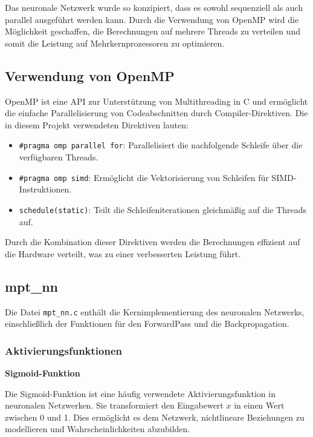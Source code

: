 \documentclass[a4paper, 12pt]{article}
\begin{document}
Das neuronale Netzwerk wurde so konzipiert, dass es sowohl sequenziell als auch parallel ausgeführt werden kann. Durch die Verwendung 
von OpenMP wird die Möglichkeit geschaffen, die Berechnungen auf mehrere Threads zu verteilen und somit die 
Leistung auf Mehrkernprozessoren zu optimieren.

\subsection{Verwendung von OpenMP}

OpenMP ist eine API zur Unterstützung von Multithreading in C und ermöglicht die einfache Parallelisierung von 
Codeabschnitten durch Compiler-Direktiven. Die in diesem Projekt verwendeten Direktiven lauten:

\begin{itemize}
    \item \texttt{\#pragma omp parallel for}: Parallelisiert die nachfolgende Schleife über die verfügbaren Threads.
    \item \texttt{\#pragma omp simd}: Ermöglicht die Vektorisierung von Schleifen für SIMD-Instruktionen.
    \item \texttt{schedule(static)}: Teilt die Schleifeniterationen gleichmäßig auf die Threads auf.
\end{itemize}

Durch die Kombination dieser Direktiven werden die Berechnungen effizient auf die Hardware verteilt, was zu einer verbesserten Leistung führt.

\subsection{mpt\_nn}
\label{subsec:mpt_nn}

Die Datei \texttt{mpt\_nn.c} enthält die Kernimplementierung des neuronalen Netzwerks, einschließlich der Funktionen für den ForwardPass und die Backpropagation.

\subsubsection{Aktivierungsfunktionen}

\textbf{Sigmoid-Funktion}

Die Sigmoid-Funktion ist eine häufig verwendete Aktivierungsfunktion in neuronalen Netzwerken. 
Sie transformiert den Eingabewert \( x \) in einen Wert zwischen 0 und 1. 
Dies ermöglicht es dem Netzwerk, nichtlineare Beziehungen zu modellieren und Wahrscheinlichkeiten abzubilden.
\end{document}
